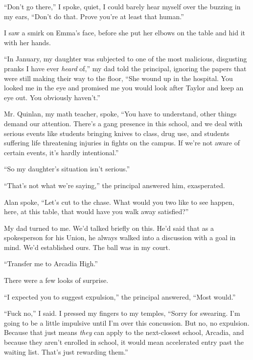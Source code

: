 ``Don't go there,'' I spoke, quiet, I could barely hear myself over the buzzing in my ears, ``Don't do that.  Prove you're at least that human.''



I saw a smirk on Emma's face, before she put her elbows on the table and hid it with her hands.



``In January, my daughter was subjected to one of the most malicious, disgusting pranks I have ever \emph{heard} of,'' my dad told the principal, ignoring the papers that were still making their way to the floor, ``She wound up in the hospital.  You looked me in the eye and promised me you would look after Taylor and keep an eye out.  You obviously haven't.''



Mr. Quinlan, my math teacher, spoke, ``You have to understand, other things demand our attention.  There's a gang presence in this school, and we deal with serious events like students bringing knives to class, drug use, and students suffering life threatening injuries in fights on the campus.  If we're not aware of certain events, it's hardly intentional.''



``So my daughter's situation isn't serious.''



``That's not what we're saying,'' the principal answered him, exasperated.



Alan spoke, ``Let's cut to the chase.  What would you two like to see happen, here, at this table, that would have you walk away satisfied?''



My dad turned to me.  We'd talked briefly on this.  He'd said that as a spokesperson for his Union, he always walked into a discussion with a goal in mind.  We'd established ours.  The ball was in my court.



``Transfer me to Arcadia High.''



There were a few looks of surprise.



``I expected you to suggest expulsion,'' the principal answered, ``Most would.''



``Fuck no,'' I said.  I pressed my fingers to my temples, ``Sorry for swearing.  I'm going to be a little impulsive until I'm over this concussion.  But no, no expulsion.  Because that just means \emph{they} can apply to the next-closest school, Arcadia, and because they aren't enrolled in school, it would mean accelerated entry past the waiting list.  That's just rewarding them.''



